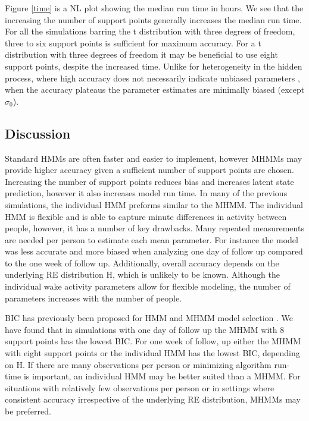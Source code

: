 \documentclass{article}
\begin{document}
Figure \ref{time} is a NL plot showing the median run time in hours. We see that the increasing the number of support points generally increases the median run time. For all the simulations barring the t distribution with three degrees of freedom, three to six support points is sufficient for maximum accuracy. For a t distribution with three degrees of freedom it may be beneficial to use eight support points, despite the increased time. Unlike for heterogeneity in the hidden process, where high accuracy does not necessarily indicate unbiased parameters \cite{mcclintock2021}, when the accuracy plateaus the parameter estimates are minimally biased (except $\sigma_0$).


\subsection{Discussion}\label{SimStudyDiscussion}

Standard HMMs are often faster and easier to implement, however MHMMs may provide higher accuracy given a sufficient number of support points are chosen. Increasing the number of support points reduces bias and increases latent state prediction, however it also increases model run time. In many of the previous simulations, the individual HMM preforms similar to the MHMM. The individual HMM is flexible and is able to capture minute differences in activity between people, however, it has a number of key drawbacks. Many repeated measurements are needed per person to estimate each mean parameter. For instance the model was less accurate and more biased when analyzing one day of follow up compared to the one week of follow up. Additionally, overall accuracy depends on the underlying RE distribution H, which is unlikely to be known. Although the individual wake activity parameters allow for flexible modeling, the number of parameters increases with the number of people.

BIC has previously been proposed for HMM and MHMM model selection \cite{maruotti2009}. We have found that in simulations with one day of follow up the MHMM with 8 support points has the lowest BIC. For one week of follow, up either the MHMM with eight support points or the individual HMM has the lowest BIC, depending on H. If there are many observations per person or minimizing algorithm run-time is important, an individual HMM may be better suited than a MHMM. For situations with relatively few observations per person or in settings where consistent accuracy irrespective of the underlying RE distribution, MHMMs may be preferred. 
\end{document}

